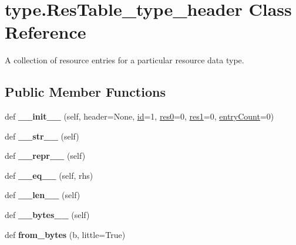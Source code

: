 \hypertarget{classtype_1_1ResTable__type__header}{}\section{type.\+Res\+Table\+\_\+type\+\_\+header Class Reference}
\label{classtype_1_1ResTable__type__header}


A collection of resource entries for a particular resource data type.  


\subsection*{Public Member Functions}
\begin{DoxyCompactItemize}
\item 
\mbox{\label{classtype_1_1ResTable__type__header_aec683273a2778f80b18b90159118c479}} 
def {\bfseries \+\_\+\+\_\+init\+\_\+\+\_\+} (self, header=None, \mbox{\hyperlink{classtype_1_1ResTable__type__header_adee0d1631145504aa375f9c1cefef1bf}{id}}=1, \mbox{\hyperlink{classtype_1_1ResTable__type__header_a067afa789aff346656808f653a5888d3}{res0}}=0, \mbox{\hyperlink{classtype_1_1ResTable__type__header_a8c51b10f036c581084351d47e34d3e01}{res1}}=0, \mbox{\hyperlink{classtype_1_1ResTable__type__header_a5c2cd8db150389cf7996622a8074b309}{entry\+Count}}=0)
\item 
\mbox{\label{classtype_1_1ResTable__type__header_a7785aff19fe9a3cb99d65b3e5593f571}} 
def {\bfseries \+\_\+\+\_\+str\+\_\+\+\_\+} (self)
\item 
\mbox{\label{classtype_1_1ResTable__type__header_a7ed5fe0cf61b7bd9346cfc66757d9e2d}} 
def {\bfseries \+\_\+\+\_\+repr\+\_\+\+\_\+} (self)
\item 
\mbox{\label{classtype_1_1ResTable__type__header_a29198e9dc1b8d5f649d63fa68814f28a}} 
def {\bfseries \+\_\+\+\_\+eq\+\_\+\+\_\+} (self, rhs)
\item 
\mbox{\label{classtype_1_1ResTable__type__header_a1acf323a8d3455d62c5c6750ca03b456}} 
def {\bfseries \+\_\+\+\_\+len\+\_\+\+\_\+} (self)
\item 
\mbox{\label{classtype_1_1ResTable__type__header_a968d632a3557eabe17196aadbb6152d2}} 
def {\bfseries \+\_\+\+\_\+bytes\+\_\+\+\_\+} (self)
\item 
\mbox{\label{classtype_1_1ResTable__type__header_ab0ab42f9ae9713744762daa1eedb9895}} 
def {\bfseries from\+\_\+bytes} (b, little=True)
\end{DoxyCompactItemize}
